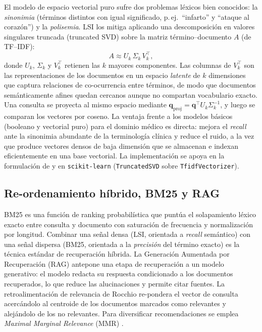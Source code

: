 \documentclass[runningheads,a4paper,14pts]{llncs}
\begin{document}
	El modelo de espacio vectorial puro sufre dos problemas léxicos bien conocidos:
	la \emph{sinonimia} (términos distintos con igual significado, p.\,ej.\ ``infarto''
	y ``ataque al corazón'') y la \emph{polisemia}. LSI \cite{deerwester1990} los
	mitiga aplicando una descomposición en valores singulares truncada (truncated
	SVD) sobre la matriz término--documento $A$ (de TF--IDF):
	\begin{equation}
		A \approx U_k\,\Sigma_k\,V_k^{\top},
	\end{equation}
	donde $U_k$, $\Sigma_k$ y $V_k^{\top}$ retienen las $k$ mayores componentes. Las
	columnas de $V_k^{\top}$ son las representaciones de los documentos en un espacio
	\emph{latente} de $k$ dimensiones que captura relaciones de co-ocurrencia entre
	términos, de modo que documentos semánticamente afines quedan cercanos aunque no
	compartan vocabulario exacto. Una consulta se proyecta al mismo espacio mediante
	$\mathbf{q}_{\text{proj}} = \mathbf{q}^{\top} U_k \Sigma_k^{-1}$, y luego se
	comparan los vectores por coseno. La ventaja frente a los modelos básicos
	(booleano y vectorial puro) para el dominio médico es directa: mejora el
	\emph{recall} ante la sinonimia abundante de la terminología clínica y reduce el
	ruido, a la vez que produce vectores densos de baja dimensión que se almacenan e
	indexan eficientemente en una base vectorial. La implementación se apoya en la
	formulación de \cite{deerwester1990,manning2008} y en \texttt{scikit-learn}
	(\texttt{TruncatedSVD} sobre \texttt{TfidfVectorizer}).
	
	\subsection{Re-ordenamiento híbrido, BM25 y RAG}
	
	BM25 \cite{robertson2009} es una función de ranking probabilística que puntúa el
	solapamiento léxico exacto entre consulta y documento con saturación de
	frecuencia y normalización por longitud. Combinar una señal densa (LSI, orientada
	a \emph{recall} semántico) con una señal dispersa (BM25, orientada a la
	\emph{precisión} del término exacto) es la técnica estándar de recuperación
	híbrida. La Generación Aumentada por Recuperación (RAG) \cite{lewis2020}
	antepone una etapa de recuperación a un modelo generativo: el modelo redacta su
	respuesta condicionado a los documentos recuperados, lo que reduce las
	alucinaciones y permite citar fuentes. La retroalimentación de relevancia de
	Rocchio \cite{rocchio1971} re-pondera el vector de consulta acercándolo al
	centroide de los documentos marcados como relevantes y alejándolo de los no
	relevantes. Para diversificar recomendaciones se emplea \emph{Maximal Marginal
		Relevance} (MMR) \cite{carbonell1998}.
	
\end{document}
